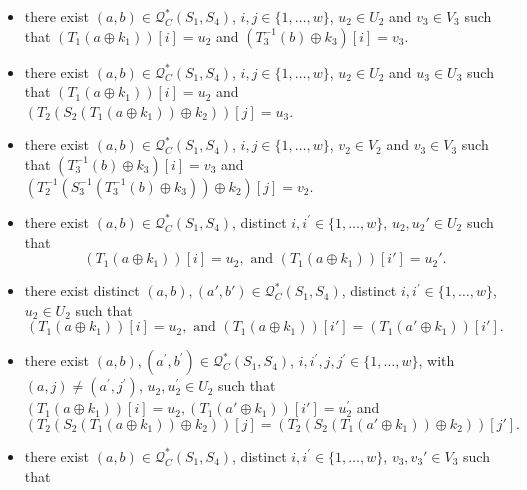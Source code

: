 \begin{itemize}
  \item[\cone]
  there exist $(a, b) \in \mathcal{Q}_{C}^{*}\left(S_{1}, S_{4}\right)$, $i, j \in\{1, \ldots, w\}$, $u_{2} \in U_{2}$ and $v_{3} \in V_{3}$ such that $\left(T_1\left(a \oplus k_{1}\right)\right)[i] = u_2$ and $\left(T_{3}^{-1}\left(b\right) \oplus k_{3}\right)[i] = v_3$.
  \item[\ctwo]
  there exist $(a, b) \in \mathcal{Q}_{C}^{*}\left(S_{1}, S_{4}\right)$, $i, j \in\{1, \ldots, w\}$, $u_{2} \in U_{2}$ and $u_{3} \in U_{3}$ such that $\left(T_1\left(a \oplus k_{1}\right)\right)[i] = u_2$ and $\left(T_{2}\left(S_{2}\left(T_1\left(a \oplus k_{1}\right)\right) \oplus k_{2}\right)\right)[j] = u_3$.
  \item[\cthree]
  there exist $(a, b) \in \mathcal{Q}_{C}^{*}\left(S_{1}, S_{4}\right)$, $i, j \in\{1, \ldots, w\}$, $v_{2} \in V_{2}$ and $v_{3} \in V_{3}$ such that $\left(T_{3}^{-1}\left(b\right) \oplus k_{3}\right)[i] = v_3$ and $\left(T_{2}^{-1}\left(S_{3}^{-1}\left(T_{3}^{-1}\left(b\right) \oplus k_{3}\right)\right) \oplus k_{2}\right)[j] = v_2$.
  \item[\cfour]
  there exist $(a, b) \in \mathcal{Q}_{C}^{*}\left(S_{1}, S_{4}\right)$, distinct $i, i^{\prime}\in\{1, \ldots, w\}$, $u_{2},u_{2}' \in U_{2}$ such that
  $$\left(T_1\left(a \oplus k_{1}\right)\right)[i] = u_2,\text{ and }
  \left(T_1\left(a \oplus k_{1}\right)\right)[i'] = u_2'.$$
  \item[\cfive]
  there exist distinct $(a, b),(a',b') \in \mathcal{Q}_{C}^{*}\left(S_{1}, S_{4}\right)$, distinct $i, i^{\prime}\in\{1, \ldots, w\}$, $u_{2} \in U_{2}$ such that
  $$\left(T_1\left(a \oplus k_{1}\right)\right)[i] = u_2,\text{ and }
 \left(T_1\left(a \oplus k_{1}\right)\right)[i'] = \left(T_1\left(a' \oplus k_{1}\right)\right)[i'].$$
  \item[\csix]
  there exist $(a, b), (a^{\prime}, b^{\prime}) \in \mathcal{Q}_{C}^{*}\left(S_{1}, S_{4}\right)$, $i, i^{\prime},j, j^{\prime} \in\{1, \ldots, w\}$, with$(a, j) \neq \left(a^{\prime}, j^{\prime}\right)$, $u_{2}, u_{2}^{\prime} \in U_{2}$ such that $\left(T_1\left(a \oplus k_{1}\right)\right)[i] = u_2, \left(T_1\left(a' \oplus k_{1}\right)\right)[i'] = u_2^{\prime}$ and
$$
 \left(T_{2}\left(S_{2}\left(T_1\left(a \oplus k_{1}\right)\right) \oplus k_{2}\right)\right)[j] = \left(T_{2}\left(S_{2}\left(T_1\left(a' \oplus k_{1}\right)\right) \oplus k_{2}\right)\right)[j'].
$$
 \item[\cseven]
  there exist $(a, b) \in \mathcal{Q}_{C}^{*}\left(S_{1}, S_{4}\right)$, distinct $i, i^{\prime}\in\{1, \ldots, w\}$, $v_{3},v_{3}' \in V_{3}$ such that

\end{itemize}
